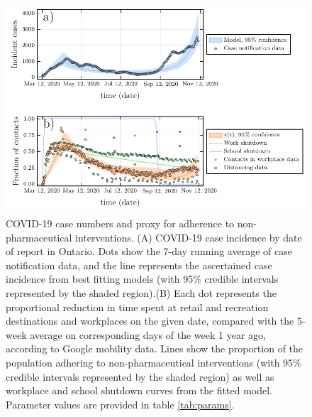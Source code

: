 \begin{figure}
\includegraphics[width=\textwidth]{chapter_3/plot_model.pdf} 
\caption{COVID-19 case numbers and proxy for adherence to non-pharmaceutical interventions. (A) COVID-19 case incidence by date of report in Ontario. Dots show the 7-day running average of case notification data, and the line represents the ascertained case incidence from best fitting models (with 95\% credible intervals represented by the shaded region).(B) Each dot represents the proportional reduction in time spent at retail and recreation destinations and workplaces on the given date, compared with the 5-week average on corresponding days of the week 1 year ago, according to Google mobility data. Lines show the proportion of the population adhering to non-pharmaceutical interventions (with 95\% credible intervals represented by the shaded region) as well as workplace and school shutdown curves from the fitted model. Parameter values are provided in table \ref{tab:params}.}
\label{fig1}
\end{figure}

